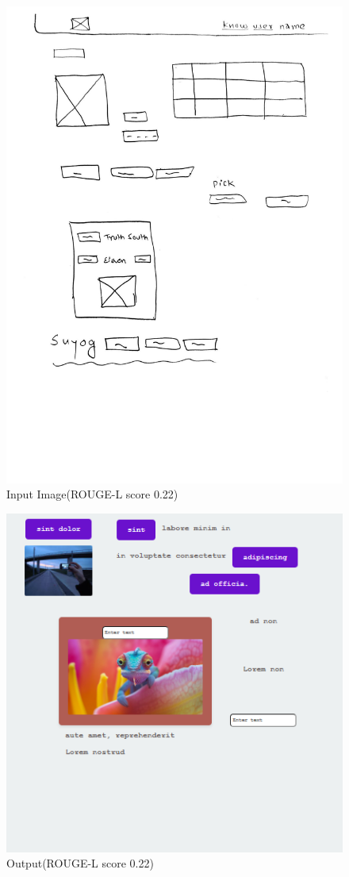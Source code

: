 \begin{figure}[H]
    \includegraphics[scale=.2, trim = 0 450 0 0]{images/m2i4.jpg}
    \centering
    \caption{Input Image(ROUGE-L score 0.22)}
    \label{fig:m24}
\end{figure}

\begin{figure}[H]
    \centering
    \includegraphics[scale=.6]{images/m2o4.png}
    \caption{Output(ROUGE-L score 0.22)}
    \label{fig:m23}
\end{figure}

